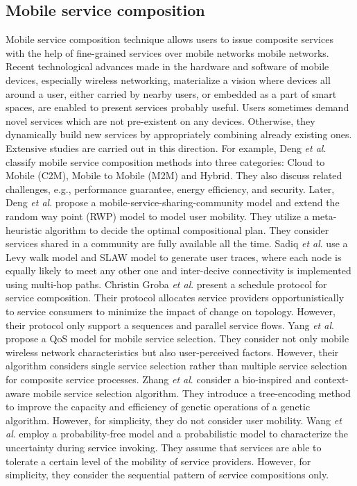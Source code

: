 \documentclass[journal]{IEEEtran}
\begin{document}
\subsection{Mobile service composition}
Mobile service composition technique allows users to issue composite services with the help of fine-grained services over mobile networks mobile networks. Recent technological advances made in the hardware and software of mobile devices, especially wireless networking, materialize a vision where devices all around a user, either carried by nearby users, or embedded as a part of smart spaces, are enabled to present services probably useful. Users sometimes demand novel services which are not pre-existent on any devices. Otherwise, they dynamically build new services by appropriately combining already existing ones. Extensive studies are carried out in this direction. 
For example, Deng \emph{et al}. \cite{Deng2016} classify mobile service composition methods into three categories: Cloud to Mobile (C2M), Mobile to Mobile (M2M) and Hybrid. They also discuss related challenges, e.g., performance guarantee, energy efficiency, and security.
Later, Deng \emph{et al}. \cite{Deng2017} propose a mobile-service-sharing-community model and extend the random way point (RWP) model to model user mobility. They utilize a meta-heuristic algorithm to decide the optimal compositional plan. They consider services shared in a community are fully available all the time.
Sadiq \emph{et al}. \cite{sadiq2015service} use a Levy walk model and SLAW model to generate user traces, where each node is equally likely to meet any other one and inter-decive connectivity is implemented using multi-hop paths.
Christin Groba \emph{et al}. \cite{groba2014opportunistic} present a schedule protocol for service composition. Their protocol allocates service providers opportunistically to service consumers to minimize the impact of change on topology. However, their protocol only support a sequences and parallel service flows.
Yang \emph{et al}. \cite{Yang2010} propose a QoS model for mobile service selection. They consider not only mobile wireless network characteristics but also user-perceived factors. However, their algorithm considers single service selection rather than multiple service selection for composite service processes.
Zhang \emph{et al}. \cite{Zhang2016qos} consider a bio-inspired and context-aware mobile service selection algorithm. They introduce a tree-encoding method to improve the capacity and efficiency of genetic operations of a genetic algorithm. However, for simplicity, they do not consider user mobility.
Wang \emph{et al}. \cite{wang2011exploiting} employ a probability-free model and a probabilistic model to characterize the uncertainty during service invoking. They assume that services are able to tolerate a certain level of the mobility of service providers. However, for simplicity, they consider the sequential pattern of service compositions only.
\end{document}
